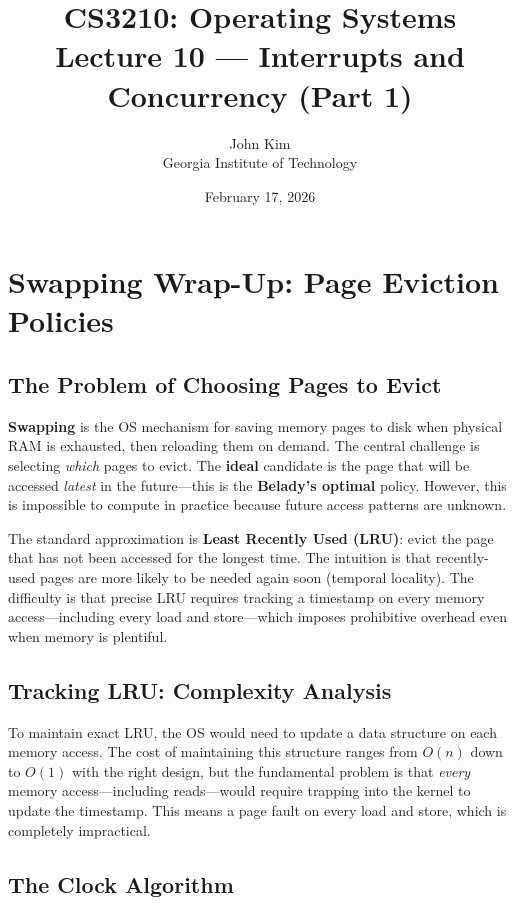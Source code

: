 \documentclass[11pt]{article}
\title{\textbf{CS3210: Operating Systems} \\ Lecture 10 --- Interrupts and Concurrency (Part 1)}
\author{John Kim \\ Georgia Institute of Technology}
\date{February 17, 2026}
\begin{document}
\maketitle
\tableofcontents
\newpage

\section{Swapping Wrap-Up: Page Eviction Policies}

\subsection{The Problem of Choosing Pages to Evict}

\textbf{Swapping} is the OS mechanism for saving memory pages to disk when physical RAM is exhausted, then reloading them on demand. The central challenge is selecting \emph{which} pages to evict. The \textbf{ideal} candidate is the page that will be accessed \emph{latest} in the future---this is the \textbf{Belady's optimal} policy. However, this is impossible to compute in practice because future access patterns are unknown.

The standard approximation is \textbf{Least Recently Used (LRU)}: evict the page that has not been accessed for the longest time. The intuition is that recently-used pages are more likely to be needed again soon (temporal locality). The difficulty is that precise LRU requires tracking a timestamp on every memory access---including every load and store---which imposes prohibitive overhead even when memory is plentiful.

\subsection{Tracking LRU: Complexity Analysis}

To maintain exact LRU, the OS would need to update a data structure on each memory access. The cost of maintaining this structure ranges from $O(n)$ down to $O(1)$ with the right design, but the fundamental problem is that \emph{every} memory access---including reads---would require trapping into the kernel to update the timestamp. This means a page fault on every load and store, which is completely impractical.

\subsection{The Clock Algorithm}
\end{document}
